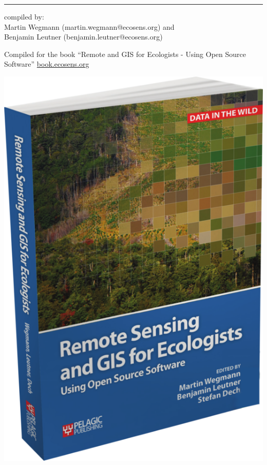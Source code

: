 \documentclass[10pt,landscape]{article}
\begin{document}
\begin{multicols}{3}

\scriptsize

\rule{0.32\textwidth}{0.4pt}

\vspace{.2cm}

compiled by: \vspace{.2cm}\\Martin Wegmann (martin.wegmann@ecosens.org) and \\Benjamin Leutner (benjamin.leutner@ecosens.org) \\ \THEYEAR	

\vspace{.2cm}

Compiled for the book ``Remote and GIS for Ecologists - Using Open Source Software'' \url{book.ecosens.org}


\bigskip

\bigskip



\begin{center}
 \includegraphics[width=.2\textwidth]{pics/RS_GIS_Ecology_book_wegmann_leutner_dech_book_ecosens_org_BookCover.png}
\end{center}



\end{multicols}
\end{document}
